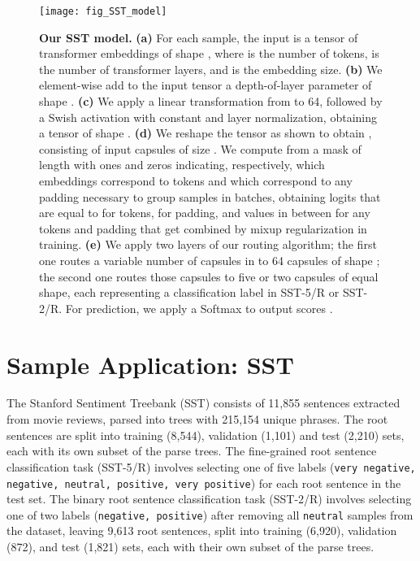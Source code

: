\documentclass[11pt,a4paper]{article}
\begin{document}
\begin{figure*}[t]
	\vskip 0.1in
	\begin{center}
		\centerline{\texttt{[image: fig\_SST\_model]}}
		\caption{\textbf{Our SST model.} \textbf{(a)} For each sample, the input is a tensor of transformer embeddings of shape , where  is the number of tokens,  is the number of transformer layers, and  is the embedding size. \textbf{(b)} We element-wise add to the input tensor a depth-of-layer parameter of shape . \textbf{(c)} We apply a linear transformation from  to 64, followed by a Swish activation with constant  and layer normalization, obtaining a tensor of shape . \textbf{(d)} We reshape the tensor as shown to obtain , consisting of  input capsules of size . We compute  from a mask  of length  with ones and zeros indicating, respectively, which embeddings correspond to tokens and which correspond to any padding necessary to group samples in batches, obtaining logits that are equal to  for tokens,  for padding, and values in between for any tokens and padding that get combined by mixup regularization in training. \textbf{(e)} We apply two layers of our routing algorithm; the first one routes a variable number of capsules in   to 64 capsules of shape ; the second one routes those capsules to five or two capsules of equal shape, each representing a classification label in SST-5/R or SST-2/R. For prediction, we apply a Softmax to output scores .}
		\label{fig:SST5R_model}
	\end{center}
	\vskip -0.2in
\end{figure*}

\section{Sample Application: SST}
\label{sec:SST5R_discussion}

The Stanford Sentiment Treebank (SST) \cite{brusilovsky:socher2013recursive} consists of 11,855 sentences extracted from movie reviews, parsed into trees with 215,154 unique phrases. The root sentences are split into training (8,544), validation (1,101) and test (2,210) sets, each with its own subset of the parse trees. The fine-grained root sentence classification task (SST-5/R) involves selecting one of five labels ({\tt \small very negative, negative, neutral, positive, very positive}) for each root sentence in the test set. The binary root sentence classification task (SST-2/R) involves selecting one of two labels ({\tt \small negative, positive}) after removing all {\tt \small neutral} samples from the dataset, leaving 9,613 root sentences, split into training (6,920), validation (872), and test (1,821) sets, each with their own subset of the parse trees.
\end{document}
